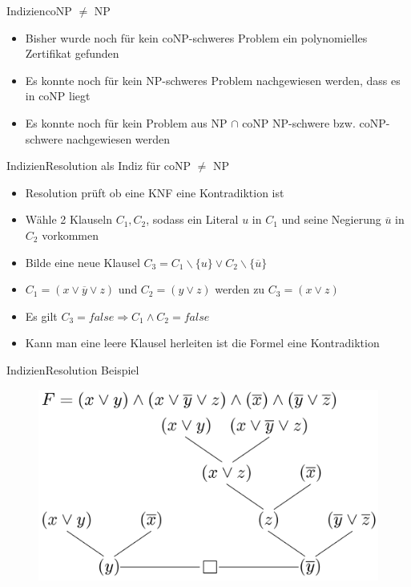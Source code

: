 \documentclass[ignorenonframetext,]{beamer}
\begin{document}
\begin{frame}{Indizien}{coNP $\neq$ NP}

\begin{itemize}
\itemsep1pt\parskip0pt
\item
  Bisher wurde noch für kein coNP-schweres Problem ein polynomielles
  Zertifikat gefunden
\item
  Es konnte noch für kein NP-schweres Problem nachgewiesen werden, dass
  es in coNP liegt
\item
  Es konnte noch für kein Problem aus NP $\cap$ coNP NP-schwere bzw.
  coNP-schwere nachgewiesen werden
\end{itemize}

\end{frame}

\begin{frame}{Indizien}{Resolution als Indiz für coNP $\neq$ NP}

\begin{itemize}
\itemsep1pt\parskip0pt
\item
  Resolution prüft ob eine KNF eine Kontradiktion ist
\item
  Wähle 2 Klauseln $C_1, C_2$, sodass ein Literal $u$ in $C_1$ und seine
  Negierung $\overline{u}$ in $C_2$ vorkommen
\item
  Bilde eine neue Klausel
  $C_3 = C_1 \backslash \{u\} \vee C_2 \backslash \{\overline{u}\}$
\item
  $C_1 = (x \vee \overline{y} \vee z)$ und $C_2 = (y \vee z)$ werden zu
  $C_3 = (x \vee z)$
\item
  Es gilt $C_3 = false \Rightarrow C_1 \wedge C_2 = false$
\item
  Kann man eine leere Klausel herleiten ist die Formel eine
  Kontradiktion
\end{itemize}

\end{frame}

\begin{frame}{Indizien}{Resolution Beispiel}

\begin{figure}[htbp]
\centering
\includegraphics{img/res-beweis.png}
\end{figure}

\end{frame}
\end{document}
